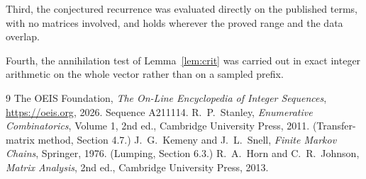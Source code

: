 \documentclass[11pt,a4paper]{article}
\theoremstyle{plain}
\theoremstyle{definition}
\begin{document}
Third, the conjectured recurrence was evaluated directly on the published terms, with no
matrices involved, and holds wherever the proved range and the data overlap.

Fourth, the annihilation test of Lemma~\ref{lem:crit} was carried out in exact integer
arithmetic on the whole vector rather than on a sampled prefix.

\begin{thebibliography}{9}
 The OEIS Foundation, \emph{The On-Line Encyclopedia of Integer
Sequences}, \url{https://oeis.org}, 2026. Sequence A211114.
 R.~P.~Stanley, \emph{Enumerative Combinatorics}, Volume 1, 2nd ed.,
Cambridge University Press, 2011. (Transfer-matrix method, Section 4.7.)
 J.~G.~Kemeny and J.~L.~Snell, \emph{Finite Markov Chains}, Springer, 1976.
(Lumping, Section 6.3.)
 R.~A.~Horn and C.~R.~Johnson, \emph{Matrix Analysis}, 2nd ed., Cambridge
University Press, 2013.
\end{thebibliography}
\end{document}

